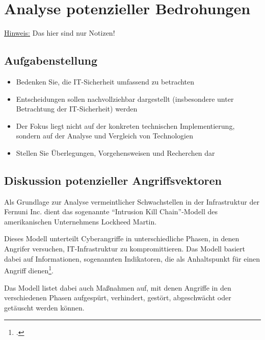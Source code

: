 \section{Analyse potenzieller Bedrohungen}

\underline{Hinweis:} Das hier sind nur Notizen!

\subsection*{Aufgabenstellung}
\begin{itemize}
    \item Bedenken Sie, die IT-Sicherheit umfassend zu betrachten
    \item  Entscheidungen sollen nachvollziehbar dargestellt (insbesondere unter Betrachtung der IT-Sicherheit) werden
    \item Der Fokus liegt nicht auf der konkreten technischen Implementierung, sondern auf der Analyse
    und Vergleich von Technologien
    \item Stellen Sie Überlegungen, Vorgehensweisen und Recherchen dar
\end{itemize}

\subsection{Diskussion potenzieller Angriffsvektoren}

Als Grundlage zur Analyse vermeintlicher Schwachstellen in der Infrastruktur der Fernuni Inc. dient das sogenannte \enquote{Intrusion Kill Chain}-Modell des amerikanischen Unternehmens Lockheed Martin.

Dieses Modell unterteilt Cyberangriffe in unterschiedliche Phasen, in denen Angrifer versuchen, IT-Infrastruktur zu kompromittieren. Das Modell basiert dabei auf Informationen, sogenannten Indikatoren, die als Anhaltspunkt für einen Angriff dienen\footcite[Vgl.][]{hutchinsIntelligenceDrivenComputerNetwork}.

Das Modell listet dabei auch Maßnahmen auf, mit denen Angriffe in den verschiedenen Phasen aufgespürt, verhindert, gestört, abgeschwächt oder getäuscht werden können.


